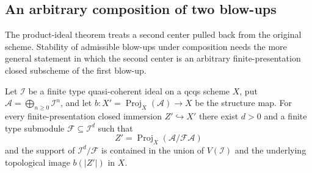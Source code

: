 \subsection{An arbitrary composition of two blow-ups}

The product-ideal theorem treats a second center pulled back from the original
scheme.  Stability of admissible blow-ups under composition needs the more
general statement in which the second center is an arbitrary finite-presentation
closed subscheme of the first blow-up.

\begin{lemma}
  \label{lemma:nagata-proj-closed-center-finite-degree-exists}
  \leanok

  Let $\mathcal I$ be a finite type quasi-coherent ideal on a qcqs scheme
  $X$, put $\mathcal A=\bigoplus_{n\geq0}\mathcal I^n$, and let
  $b\colon X'=\operatorname{Proj}_X(\mathcal A)\to X$ be the structure map.
  For every finite-presentation
  closed immersion $Z'\hookrightarrow X'$ there exist $d>0$ and a finite type
  submodule $\mathcal F\subseteq\mathcal I^d$ such that
  \[
    Z'=\operatorname{Proj}_X(\mathcal A/\mathcal F\mathcal A)
  \]
  and the support of $\mathcal I^d/\mathcal F$ is contained in the union of
  $V(\mathcal I)$ and the underlying topological image $b(|Z'|)$ in $X$.
\end{lemma}

